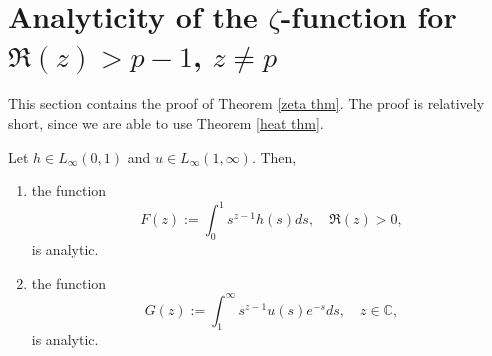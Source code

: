 \section{Analyticity of the $\zeta$-function for $\Re(z)>p-1$, $z \neq p$}\label{zeta section}
    This section contains the proof of Theorem \ref{zeta thm}. The proof is relatively short, since we are able to use Theorem \ref{heat thm}.
    
    \begin{lem}\label{simple lemma} 
        Let $h\in L_{\infty}(0,1)$ and $u \in L_\infty(1,\infty)$. Then,
        \begin{enumerate}[{\rm (i)}]
            \item\label{simple lemma 1} the function
                $$F(z) := \int_0^1s^{z-1}h(s)ds,\quad\Re(z)>0,$$
            is analytic.
            \item\label{simple lemma 2} the function
                $$G(z) := \int_1^{\infty}s^{z-1}u(s)e^{-s}ds,\quad z\in\mathbb{C},$$
            is analytic.
        \end{enumerate}
    \end{lem}

